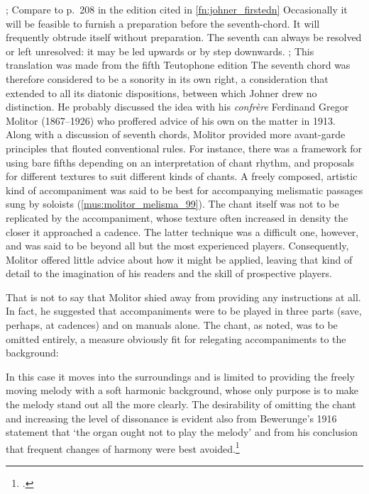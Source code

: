   {\cite[p.~135*]{JohnerNeueSchulegregorianischen1921}; Compare to p.~208 in the edition cited in \cref{fn:johner_firstedn}}
{Occasionally it will be feasible to \mbox{furnish} a preparation before the seventh-chord. It will frequently obtrude itself without preparation. The seventh can always be resolved or left unresolved: it may be led upwards or by step downwards.}
  {\cite[290--91]{JohnerNewSchoolGregorian1925}; This translation was made from the fifth Teutophone edition}
\noindent
The seventh chord was therefore considered to be a sonority in its own right, a consideration that extended to all its diatonic dispositions, between which Johner drew no distinction.
%
He probably discussed the idea with his \emph{confrère}  Ferdinand Gregor Molitor (1867--1926) who proffered advice of his own on the matter in 1913.
Along with a discussion of seventh chords, Molitor provided more avant-garde principles that flouted conventional rules.
For instance, there was a framework for using bare fifths depending on an interpretation of chant rhythm, and proposals for different textures to suit different kinds of chants.
A freely composed, artistic kind of accompaniment was said to be best for accompanying melismatic passages sung by soloists (\cref{mus:molitor_melisma_99}).
The chant itself was not to be replicated by the accompaniment, whose texture often increased in density the closer it approached a cadence.
The latter technique was a difficult one, however, and was said to be beyond all but the most experienced players.
Consequently, Molitor offered little advice about how it might be applied, leaving that kind of detail to the imagination of his readers and the skill of prospective players.

That is not to say that Molitor shied away from providing any instructions at all.
In fact, he suggested that accompaniments were to be played in three parts (save, perhaps, at cadences) and on manuals alone.
The chant, as noted, was to be omitted entirely, a measure obviously fit for relegating accompaniments to the background:

  {\cite[92--101]{MolitordiatonischrhythmischeHarmonisationgregorianischen1913}}
{In this case it moves into the surroundings and is limited to providing the freely moving melody with a soft harmonic background, whose only purpose is to make the melody stand out all the more clearly.}
\noindent
The desirability of omitting the chant and increasing the level of dissonance is evident also from Bewerunge's 1916 statement that `the organ ought not to play the melody' and from his conclusion that frequent changes of harmony were best avoided.\footcite[252]{McCarthyHeinrichBewerunge18622015}

